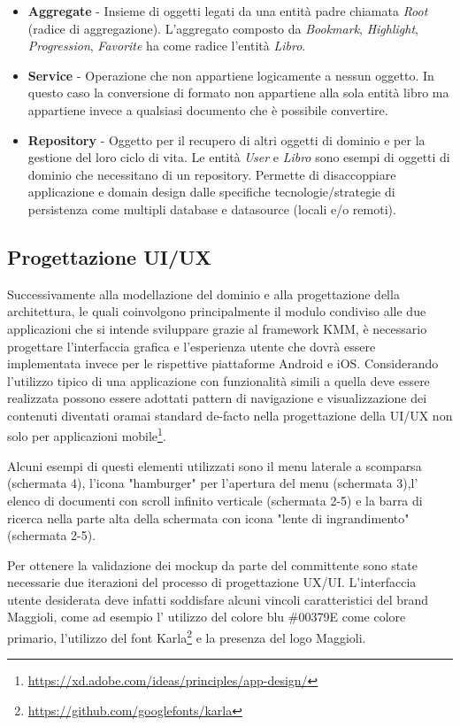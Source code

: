 \begin{itemize}
    \item \textbf{Aggregate} - Insieme di oggetti legati da una entità padre chiamata \textit{Root} (radice di aggregazione). L'aggregato composto da \textit{Bookmark}, \textit{Highlight}, \textit{Progression}, \textit{Favorite} ha come radice l'entità \textit{Libro}.
    \item \textbf{Service} - Operazione che non appartiene logicamente a nessun oggetto. In questo caso la conversione di formato non appartiene alla sola entità libro ma appartiene invece a qualsiasi documento che è possibile convertire.
    \item \textbf{Repository} - Oggetto per il recupero di altri oggetti di dominio e per la gestione del loro ciclo di vita. Le entità \textit{User} e \textit{Libro} sono esempi di oggetti di dominio che necessitano di un repository. Permette di disaccoppiare applicazione e domain design dalle specifiche tecnologie/strategie di persistenza come multipli database e datasource (locali e/o remoti).
\end{itemize}

\subsection{Progettazione UI/UX}
Successivamente alla modellazione del dominio e alla progettazione della architettura, le quali coinvolgono principalmente il modulo condiviso alle due applicazioni che si intende sviluppare grazie al framework KMM, è necessario progettare l'interfaccia grafica e l'esperienza utente che dovrà essere implementata invece per le rispettive piattaforme Android e iOS. Considerando l'utilizzo tipico di una applicazione con funzionalità simili a quella deve essere realizzata possono essere adottati pattern di navigazione e visualizzazione dei contenuti diventati oramai standard de-facto nella progettazione della UI/UX non solo per applicazioni mobile\footnote{\href{https://xd.adobe.com/ideas/principles/app-design/}{https://xd.adobe.com/ideas/principles/app-design/}}.

Alcuni esempi di questi elementi utilizzati sono il menu laterale a scomparsa (schermata 4), l'icona "hamburger" per l'apertura del menu (schermata 3),l' elenco di documenti con scroll infinito verticale (schermata 2-5) e la barra di ricerca nella parte alta della schermata con icona "lente di ingrandimento" (schermata 2-5). 

Per ottenere la validazione dei mockup da parte del committente sono state necessarie due iterazioni del processo di progettazione UX/UI. L'interfaccia utente desiderata deve infatti soddisfare alcuni vincoli caratteristici del brand Maggioli, come ad esempio l' utilizzo del colore blu \#00379E come colore primario, l'utilizzo del font Karla\footnote{\href{https://github.com/googlefonts/karla}{https://github.com/googlefonts/karla}} e la presenza del logo Maggioli.

